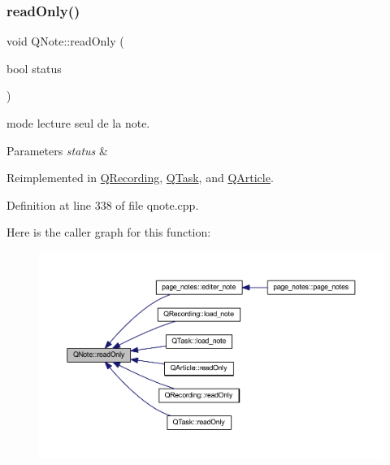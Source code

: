 \subsubsection{\texorpdfstring{read\+Only()}{readOnly()}}
{\footnotesize\ttfamily void Q\+Note\+::read\+Only (\begin{DoxyParamCaption}\item[{bool}]{status }\end{DoxyParamCaption})\hspace{0.3cm}{\ttfamily [virtual]}}



mode lecture seul de la note. 


\begin{DoxyParams}{Parameters}
{\em status} & \\
\hline
\end{DoxyParams}


Reimplemented in \hyperlink{class_q_recording_a98fa21d8814450c0d912c8ce102ca832}{Q\+Recording}, \hyperlink{class_q_task_a1bf9080c14e7a94094bde3fa315d66d9}{Q\+Task}, and \hyperlink{class_q_article_af6c14f4ce3df750a0e1a22207309068e}{Q\+Article}.



Definition at line 338 of file qnote.\+cpp.

Here is the caller graph for this function\+:\nopagebreak
\begin{figure}[H]
\begin{center}
\leavevmode
\includegraphics[width=350pt]{class_q_note_ae6fb14b839acc1979b145a892d6a0a92_icgraph}
\end{center}
\end{figure}
\mbox{\label{class_q_note_a577f684ef199a17dc468d706b1383581}} 
